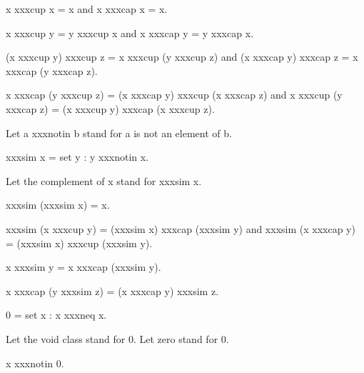 \documentclass[a4paper,draft]{amsproc}
\begin{document}
{\begin{forthel}
\begin{theorem}[5]
x xxxcup x = x and x xxxcap x = x.
\end{theorem}

\begin{theorem}[6]
x xxxcup y = y xxxcup x and x xxxcap y = y xxxcap x.
\end{theorem}

\begin{theorem}[7]
(x xxxcup y) xxxcup z = x xxxcup (y xxxcup z) 
and (x xxxcap y) xxxcap z = x xxxcap (y xxxcap z).
\end{theorem}

\begin{theorem}[8]
x xxxcap (y xxxcup z) = (x xxxcap y) xxxcup (x xxxcap z)
and x xxxcup (y xxxcap z) = (x xxxcup y) xxxcap (x xxxcup z).
\end{theorem}

Let a xxxnotin b stand for a is not an element of b.

\begin{definition}[10] 
xxxsim x = {set y : y xxxnotin x}.\end{definition}
Let the complement of x stand for xxxsim x.

\begin{theorem}[11]
xxxsim (xxxsim x) = x.
\end{theorem}

\begin{theorem}[12]
xxxsim (x xxxcup y) = (xxxsim x) xxxcap (xxxsim y) 
and xxxsim (x xxxcap y) = (xxxsim x) xxxcup (xxxsim y).
\end{theorem}

\begin{definition}[13] x xxxsim y = x xxxcap (xxxsim y).\end{definition}

\begin{theorem}[14]
x xxxcap (y xxxsim z) = (x xxxcap y) xxxsim z.
\end{theorem}

\begin{definition}[15] 
0 = {set x : x xxxneq x}.
\end{definition}
Let the void class stand for 0.
Let zero stand for 0.

\begin{theorem}[16]
x xxxnotin 0.
\end{theorem}


\end{forthel}}
\end{document}
